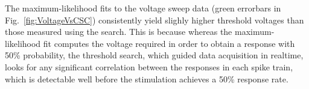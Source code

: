 \documentclass[10pt,letterpaper]{article}
\newcommand\fig[1]{Fig.~\ref{#1}}
\newcommand{\noprint}[1]{}
\begin{document}
The maximum-likelihood fits to the voltage sweep data (green errorbars
in \fig{fig:VoltageVsCSC}) consistently yield slighly higher threshold
voltages than those measured using the search.  This is because
whereas the maximum-likelihood fit computes the voltage required in
order to obtain a response with 50\% probability, the threshold
search, which guided data acquisition in realtime, looks for any
significant correlation between the responses in each spike train,
which is detectable well before the stimulation achieves a 50\%
response rate.

\noprint{FIXME: The following caveat doesn't apply to
  lw95rhp-2015-12-04: Each threshold scan terminated when a
  stimulation voltage over 3 V was detected, so for some datasets
  (e.g. lw95rhp-2015-12-09) we were unable to acquire all five
  measurements for some CSCs, and thus they are worse than the figure
  shows.}
\end{document}
